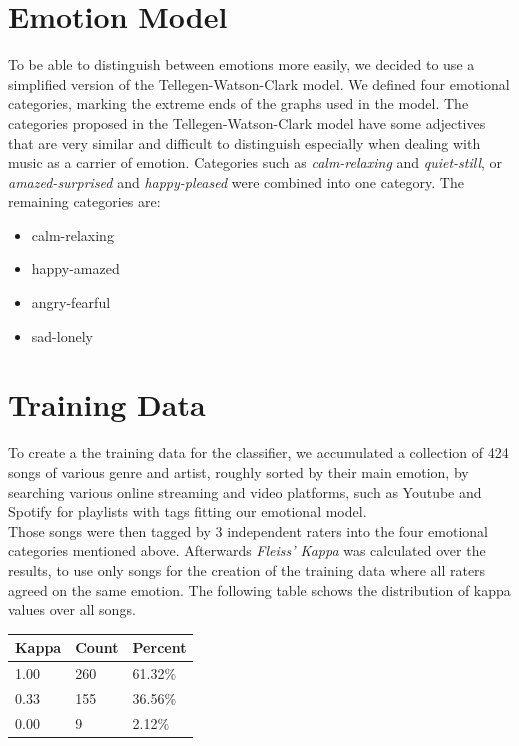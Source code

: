 \begin{multicols}{2}
\section{Emotion Model}
To be able to distinguish between emotions more easily, we decided to use a simplified version of the Tellegen-Watson-Clark model. We defined four emotional categories, marking the extreme ends of the graphs used in the model. The categories proposed in the Tellegen-Watson-Clark model have some adjectives that are very similar and difficult to distinguish especially when dealing with music as a carrier of emotion. Categories such as \textit{calm-relaxing} and \textit{quiet-still}, or \textit{amazed-surprised} and \textit{happy-pleased} were combined into one category. The remaining categories are:

\begin{itemize}
	\item calm-relaxing
	\item happy-amazed
	\item angry-fearful
	\item sad-lonely
\end{itemize}

\section{Training Data}\label{training-data}
To create a the training data for the classifier, we accumulated a collection of 424 songs of various genre and artist, roughly sorted by their main emotion, by searching various online streaming and video platforms, such as Youtube and Spotify for playlists with tags fitting our emotional model.\\
Those songs were then tagged by 3 independent raters into the four emotional categories mentioned above. Afterwards \textit{Fleiss' Kappa} was calculated over the results, to use only songs for the creation of the training data where all raters agreed on the same emotion. The following table schows the distribution of kappa values over all songs.\\

\begin{center}
\label{kappa-distribution}
\begin{tabular}{@{}lll@{}}
Kappa & Count & Percent \\ \midrule
1.00 & 260 & 61.32\% \\
0.33 & 155 & 36.56\% \\
0.00 & 9 	 & 2.12\%
\end{tabular}
\end{center}


\end{multicols}
